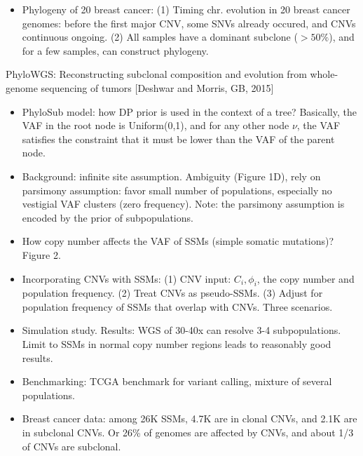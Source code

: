 \documentclass{report}
\begin{document}
\begin{itemize}
	\item Phylogeny of 20 breast cancer: (1) Timing chr. evolution in 20 breast cancer genomes: before the first major CNV, some SNVs already occured, and CNVs continuous ongoing. (2) All samples have a dominant subclone ($>50\%$), and for a few samples, can construct phylogeny. 
\end{itemize}

PhyloWGS: Reconstructing subclonal composition and evolution from whole-genome sequencing of tumors [Deshwar and Morris, GB, 2015]
\begin{itemize}
	
	\item PhyloSub model: how DP prior is used in the context of a tree? Basically, the VAF in the root node is Uniform(0,1), and for any other node $\nu$, the VAF satisfies the constraint that it must be lower than the VAF of the parent node. 
	
	\item Background: infinite site assumption. Ambiguity (Figure 1D), rely on parsimony assumption: favor small number of populations, especially no vestigial VAF clusters (zero frequency). Note: the parsimony assumption is encoded by the prior of subpopulations. 
	
	\item How copy number affects the VAF of SSMs (simple somatic mutations)? Figure 2. 
	
	\item Incorporating CNVs with SSMs: (1) CNV input: $C_i, \phi_i$, the copy number and population frequency. (2) Treat CNVs as pseudo-SSMs. (3) Adjust for population frequency of SSMs that overlap with CNVs. Three scenarios. 
	
	\item Simulation study. Results: WGS of 30-40x can resolve 3-4 subpopulations. Limit to SSMs in normal copy number regions leads to reasonably good results. 
	
	\item Benchmarking: TCGA benchmark for variant calling, mixture of several populations. 
	
	\item Breast cancer data: among 26K SSMs, 4.7K are in clonal CNVs, and 2.1K are in subclonal CNVs. Or 26\% of genomes are affected by CNVs, and about 1/3 of CNVs are subclonal. 
\end{itemize}
\end{document}
